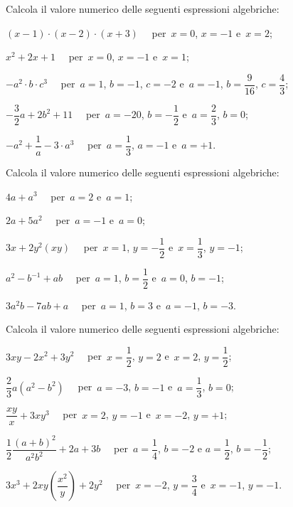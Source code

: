 \begin{esercizio}
\label{ese:8.21}
Calcola il valore numerico delle seguenti espressioni algebriche:
 \begin{enumeratea}
\spazielenx
 \item $(x-1)\cdot (x-2)\cdot (x+3)\quad$ per~$x=0$, $x= -1$ e~$x= 2$;
 \item $x^{2}+2x+1\quad$ per~$x=0$, $x= -1$ e~$x= 1$;
 \item $-a^{2}\cdot b\cdot c^{3}\quad$ per~$a=1$, $b=-1$, $c=-2$ e~$a=-1$, $b=\dfrac{9}{16}$, $c=\dfrac{4}{3}$;
 \item $-{\dfrac{3}{2}}a+2b^{2}+11\quad$ per~$a=-20$, $b=-{\dfrac{1}{2}}$ e~$a=\dfrac{2}{3}$, $b=0$;
 \item $-a^{2}+\dfrac{1}{a}-3\cdot a^{3}\quad$ per~$a=\dfrac{1}{3}$, $a=-1$ e~$a=+1$.
 \end{enumeratea}
\end{esercizio}

\begin{esercizio}[\Ast]
\label{ese:8.22}
Calcola il valore numerico delle seguenti espressioni algebriche:
 \begin{enumeratea}
\spazielenx
 \item $4a+a^{3}\quad$ per~$a=2$ e~$a=1$;
 \item $2a+5a^{2}\quad$ per~$a=-1$ e~$a=0$;
 \item $3x+2y^{2}(xy)\quad$ per~$x=1$, $y=-{\dfrac{1}{2}}$ e~$x=\dfrac{1}{3}$, $y=-1$;
 \item $a^{2}-b^{-1}+ab\quad$ per~$a=1$, $b=\dfrac{1}{2}$ e~$a=0$, $b=-1$;
 \item $3a^{2}b-7ab+a\quad$ per~$a=1$, $b=3$ e~$a=-1$, $b=-3$.
 \end{enumeratea}
\end{esercizio}
\pagebreak
\begin{esercizio}[\Ast]
\label{ese:8.23}
Calcola il valore numerico delle seguenti espressioni algebriche:
 \begin{enumeratea}
\spazielenx
 \item $3xy-2x^{2}+3y^{2}\quad$ per~$x=\dfrac{1}{2}$, $y=2$ e~$x=2$, $y=\dfrac{1}{2}$;
 \item $\dfrac{2}{3}a\left(a^2-b^2 \right) \quad$ per~$a=-3$, $b=-1$ e~$a=\dfrac{1}{3}$, $b=0$;
 \item $\dfrac{xy}{x}+3xy^{3}\quad$ per~$x=2$, $y=-1$ e~$x=-2$, $y=+1$;
 \item $\dfrac{1}{2}\dfrac{(a+b)^{2}}{a^{2}b^{2}}+2a+3b\quad$ per~$a=\dfrac{1}{4}$, $b=-2$ e $a=\dfrac{1}{2}$, $b=-{\dfrac{1}{2}}$;
 \item $3x^{3}+2xy\left(\dfrac{x^{2}}{y}\right)+2y^{2}\quad$ per~$x=-2$, $y=\dfrac{3}{4}$ e~$x=-1$, $y=-1$.
 \end{enumeratea}
\end{esercizio}

